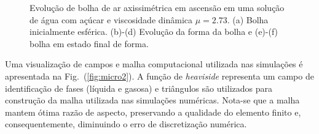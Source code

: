 \documentclass[a4paper,portuges,12pt]{article}
\begin{document}
\begin{figure}[!h]
\begin{center}
		\hspace{0.7cm}
		\hspace{0.7cm}
	\end{center}
   \caption{Evolução de bolha de ar axissimétrica em ascensão em uma
   solução de água com açúcar e viscosidade dinâmica $\mu=2.73$. (a)
   Bolha inicialmente esférica. (b)-(d) Evolução da forma da bolha e
   (e)-(f) bolha em estado final de forma.} 
   \label{fig:micro1} 
\end{figure}

Uma visualização de campos e malha computacional utilizada nas
simulações é apresentada na Fig.~(\ref{fig:micro2}). A função de
\emph{heaviside} representa um campo de identificação de fases (líquida
e gasosa) e triângulos são utilizados para construção da malha utilizada
nas simulações numéricas. Nota-se que a malha mantem ótima razão de
aspecto, preservando a qualidade do elemento finito e, consequentemente,
diminuindo o erro de discretização numérica.
\end{document}
